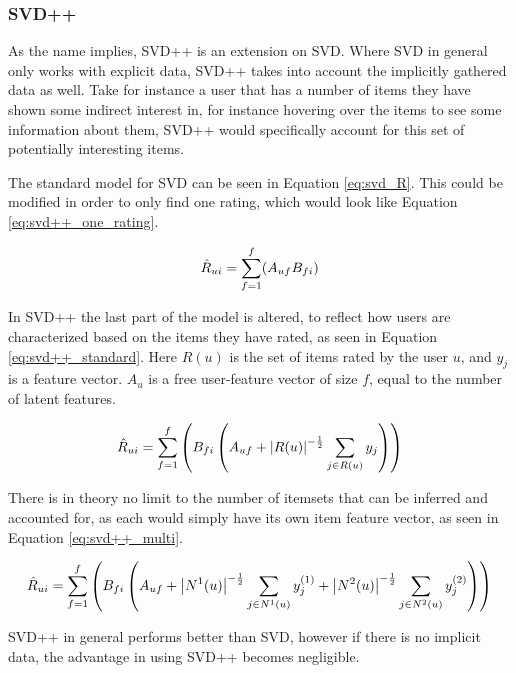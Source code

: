 \subsubsection{SVD++} \label{bg:mf_svd++}
As the name implies, SVD++ is an extension on SVD. Where SVD in general only works with explicit data, SVD++ takes into account the implicitly gathered data as well. Take for instance a user that has a number of items they have shown some indirect interest in, for instance hovering over the items to see some information about them, SVD++ would specifically account for this set of potentially interesting items\cite{svd++}.

The standard model for SVD can be seen in Equation \ref{eq:svd_R}. This could be modified in order to only find one rating, which would look like Equation \ref{eq:svd++_one_rating}.

\begin{equation} \label{eq:svd++_one_rating}
\centering
\hat{R}_{ui} = \sum^f_{f=1}(A_{uf}B_{fi})
\end{equation}

In SVD++ the last part of the model is altered, to reflect how users are characterized based on the items they have rated, as seen in Equation \ref{eq:svd++_standard}. Here $R(u)$ is the set of items rated by the user $u$, and $y_{j}$ is a feature vector. $A_{u}$ is a free user-feature vector of size $f$, equal to the number of latent features.

\begin{equation} \label{eq:svd++_standard}
\centering
\hat{R}_{ui} =\sum^f_{f=1}\left(B_{fi}\left (A_{uf} + \left | R(u) \right |^{-\frac{1}{2}} \sum_{j\in R(u)} y_{j} \right )\right)
\end{equation}

There is in theory no limit to the number of itemsets that can be inferred and accounted for, as each would simply have its own item feature vector, as seen in Equation \ref{eq:svd++_multi}.

\begin{equation} \label{eq:svd++_multi}
\centering
\hat{R}_{ui} = \sum^f_{f=1}\left( B_{fi}\left (A_{uf} + \left | N^{1}(u) \right |^{-\frac{1}{2}} \sum_{j\in N^{1}(u)} y_{j}^{(1)} + \left | N^{2}(u) \right |^{-\frac{1}{2}} \sum_{j\in N^{2}(u)} y_{j}^{(2)} \right )\right)
\end{equation}

SVD++ in general performs better than SVD, however if there is no implicit data, the advantage in using SVD++ becomes negligible.